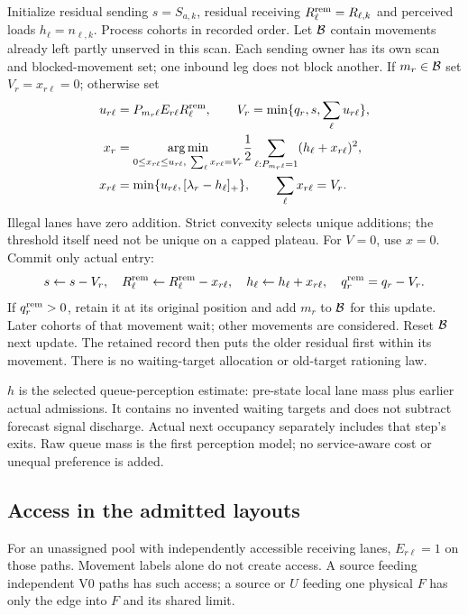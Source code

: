 \documentclass[10pt,a4paper]{article}
\newcommand{\pos}[1]{[#1]_+}
\begin{document}
Initialize residual sending $s=S_{a,k}$, residual receiving
$R^{\rm rem}_\ell=R_{\ell,k}$ and perceived loads $h_\ell=n_{\ell,k}$.
Process cohorts in recorded order. Let ${\cal B}$ contain movements
already left partly unserved in this scan. Each sending owner has its own
scan and blocked-movement set; one inbound leg does not block another.
If $m_r\in{\cal B}$ set $V_r=x_{r\ell}=0$; otherwise set
\begin{align}
 u_{r\ell}&=P_{m_r\ell}E_{r\ell}R^{\rm rem}_\ell,\qquad
 V_r=\min\{q_r,s,\sum_\ell u_{r\ell}\},\nonumber\\
 x_r&=\underset{0\leq x_{r\ell}\leq u_{r\ell},\
                    \sum_\ell x_{r\ell}=V_r}{\arg\min}
          \frac12\sum_{\ell:P_{m_r\ell}=1}(h_\ell+x_{r\ell})^2,
 \nonumber\\
 x_{r\ell}&=\min\{u_{r\ell},\pos{\lambda_r-h_\ell}\},\qquad
                    \sum_\ell x_{r\ell}=V_r .
 \label{eq:allocation}
\end{align}
Illegal lanes have zero addition. Strict convexity selects unique
additions; the threshold itself need not be unique on a capped plateau.
For $V=0$, use $x=0$. Commit only actual entry:
\begin{equation}
 s\leftarrow s-V_r,\quad
 R^{\rm rem}_\ell\leftarrow R^{\rm rem}_\ell-x_{r\ell},\quad
 h_\ell\leftarrow h_\ell+x_{r\ell},\quad
 q_r^{\rm rem}=q_r-V_r .
 \label{eq:allocation-update}
\end{equation}
If $q_r^{\rm rem}>0$, retain it at its original position and add $m_r$
to ${\cal B}$ for this update. Later cohorts of that movement wait;
other movements are considered. Reset ${\cal B}$ next update.
The retained record then puts the older residual first within its
movement. There is no waiting-target allocation or old-target rationing law.

$h$ is the selected queue-perception estimate: pre-state local lane mass
plus earlier actual admissions. It contains no invented waiting targets
and does not subtract forecast signal discharge. Actual next occupancy
separately includes that step's exits. Raw queue mass is the first
perception model; no service-aware cost or unequal preference is added.

\subsection*{Access in the admitted layouts}

For an unassigned pool with independently accessible receiving lanes,
$E_{r\ell}=1$ on those paths. Movement labels alone do not create access.
A source feeding independent V0 paths has such access; a source or $U$
feeding one physical $F$ has only the edge into $F$ and its shared limit.
\end{document}
